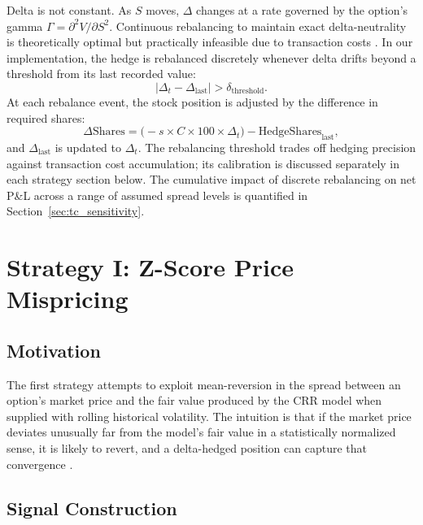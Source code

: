 \documentclass[10pt,twocolumn]{article}
\begin{document}
Delta is not constant. As $S$ moves, $\Delta$ changes at a rate governed by
the option's gamma $\Gamma = \partial^2 V / \partial S^2$. Continuous
rebalancing to maintain exact delta-neutrality is theoretically optimal but
practically infeasible due to transaction costs \cite{whalley1997}. In our
implementation, the hedge is rebalanced discretely whenever delta drifts
beyond a threshold from its last recorded value:
%
\begin{equation}
|\Delta_t - \Delta_{\text{last}}| > \delta_{\text{threshold}}.
\end{equation}
%
At each rebalance event, the stock position is adjusted by the difference in
required shares:
%
\begin{equation}
\Delta\text{Shares} = \bigl(-s \times C \times 100 \times \Delta_t\bigr)
                    - \text{HedgeShares}_{\text{last}},
\end{equation}
%
and $\Delta_{\text{last}}$ is updated to $\Delta_t$. The rebalancing
threshold trades off hedging precision against transaction cost accumulation;
its calibration is discussed separately in each strategy section below.
The cumulative impact of discrete rebalancing on net P\&L across a range of
assumed spread levels is quantified in Section~\ref{sec:tc_sensitivity}.


\section{Strategy I: Z-Score Price Mispricing}
\label{sec:zscore_strategy}

\subsection{Motivation}

The first strategy attempts to exploit mean-reversion in the spread between
an option's market price and the fair value produced by the CRR model when
supplied with rolling historical volatility. The intuition is that if the
market price deviates unusually far from the model's fair value in a
statistically normalized sense, it is likely to revert, and a delta-hedged
position can capture that convergence \cite{stein1989}.

\subsection{Signal Construction}
\end{document}
